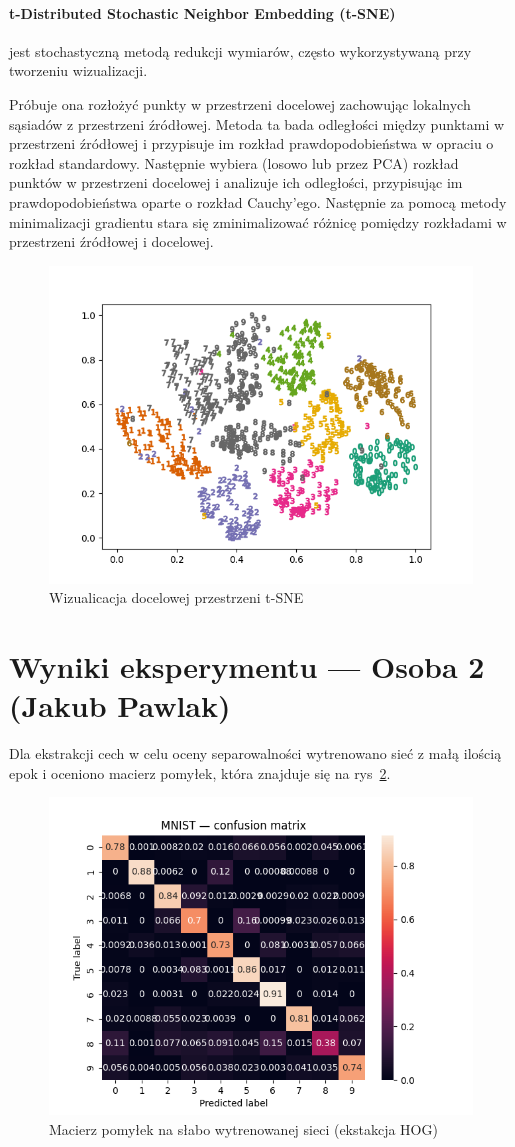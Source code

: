 \documentclass[10pt]{article}
\begin{document}
\paragraph{t-Distributed Stochastic Neighbor Embedding (t-SNE)} jest stochastyczną metodą redukcji wymiarów, często wykorzystywaną przy tworzeniu wizualizacji.


Próbuje ona rozłożyć punkty w przestrzeni docelowej zachowując lokalnych sąsiadów z przestrzeni źródłowej.
Metoda ta bada odległości między punktami w przestrzeni źródłowej i przypisuje im rozkład prawdopodobieństwa w opraciu o rozkład standardowy.
Następnie wybiera (losowo lub przez PCA) rozkład punktów w przestrzeni docelowej i analizuje ich odległości, przypisując im prawdopodobieństwa oparte o rozkład Cauchy'ego.
Następnie za pomocą metody minimalizacji gradientu stara się zminimalizować różnicę pomiędzy rozkładami w przestrzeni źródłowej i docelowej.

\begin{figure}[H]\centering
    \includegraphics[width=.6\linewidth]{img/tsne_embedding.png}
    \caption{Wizualicacja docelowej przestrzeni t-SNE}\label{fig:tsne-embed}
\end{figure}

\pagebreak

\section{Wyniki eksperymentu --- Osoba 2 (Jakub Pawlak)}

Dla ekstrakcji cech w celu oceny separowalności wytrenowano sieć z małą ilością epok i oceniono macierz pomyłek, która znajduje się na rys~\ref{fig:hog-bad-cm}.

\begin{figure}[H]\centering
    \includegraphics[width=.3\linewidth]{img/mnist_hog_bad_cm.png}
    \caption{Macierz pomyłek na słabo wytrenowanej sieci (ekstakcja HOG)}\label{fig:hog-bad-cm}
\end{figure}
\end{document}
